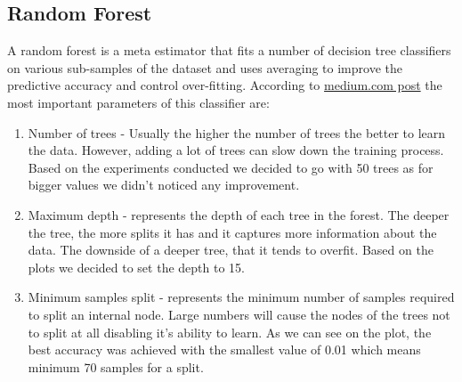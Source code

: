 \documentclass[12pt]{article}
\begin{document}
\newpage
\subsection{Random Forest}
A random forest is a meta estimator that fits a number of decision tree classifiers on various sub-samples of the dataset and uses averaging to improve the predictive accuracy and control over-fitting. According to \href{https://medium.com/all-things-ai/in-depth-parameter-tuning-for-random-forest-d67bb7e920d}{medium.com post} the most important parameters of this classifier are:
\begin{enumerate}
	\item Number of trees - Usually the higher the number of trees the better to learn the data. However, adding a lot of trees can slow down the training process. Based on the experiments conducted we decided to go with 50 trees as for bigger values we didn't noticed any improvement.
	\item Maximum depth - represents the depth of each tree in the forest. The deeper the tree, the more splits it has and it captures more information about the data. The downside of a deeper tree, that it tends to overfit. Based on the plots we decided to set the depth to 15.
	\item Minimum samples split - represents the minimum number of samples required to split an internal node. Large numbers will cause the nodes of the trees not to split at all disabling it's ability to learn. As we can see on the plot, the best accuracy was achieved with the smallest value of 0.01 which means minimum 70 samples for a split.
\end{enumerate}
\end{document}
